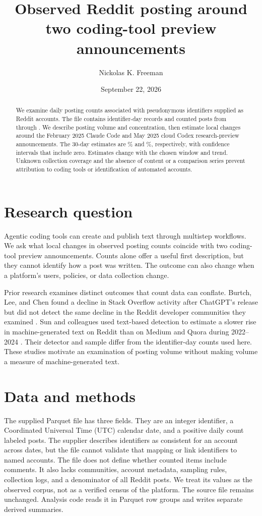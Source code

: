 \documentclass[11pt]{article}
\title{Observed Reddit posting around two coding-tool preview announcements}
\author{Nickolas K. Freeman}
\date{September 22, 2026}
\begin{document}
\maketitle

\begin{abstract}
We examine daily posting counts associated with pseudonymous identifiers supplied as Reddit accounts. The file contains \dataUserDays{} identifier-day records and \dataPosts{} counted posts from \dataFirstDate{} through \dataLastRawDate{}. We describe posting volume and concentration, then estimate local changes around the February 2025 Claude Code and May 2025 cloud Codex research-preview announcements. The 30-day estimates are \claudeChange\% and \codexChange\%, respectively, with confidence intervals that include zero. Estimates change with the chosen window and trend. Unknown collection coverage and the absence of content or a comparison series prevent attribution to coding tools or identification of automated accounts.
\end{abstract}

\section{Research question}
Agentic coding tools can create and publish text through multistep workflows. We ask what local changes in observed posting counts coincide with two coding-tool preview announcements. Counts alone offer a useful first description, but they cannot identify how a post was written. The outcome can also change when a platform's users, policies, or data collection change.

Prior research examines distinct outcomes that count data can conflate. Burtch, Lee, and Chen found a decline in Stack Overflow activity after ChatGPT's release but did not detect the same decline in the Reddit developer communities they examined \cite{burtch2024}. Sun and colleagues used text-based detection to estimate a slower rise in machine-generated text on Reddit than on Medium and Quora during 2022--2024 \cite{sun2025}. Their detector and sample differ from the identifier-day counts used here. These studies motivate an examination of posting volume without making volume a measure of machine-generated text.

\section{Data and methods}
The supplied Parquet file has three fields. They are an integer identifier, a Coordinated Universal Time (UTC) calendar date, and a positive daily count labeled posts. The supplier describes identifiers as consistent for an account across dates, but the file cannot validate that mapping or link identifiers to named accounts. The file does not define whether counted items include comments. It also lacks communities, account metadata, sampling rules, collection logs, and a denominator of all Reddit posts. We treat its values as the observed corpus, not as a verified census of the platform. The source file remains unchanged. Analysis code reads it in Parquet row groups and writes separate derived summaries.
\end{document}
